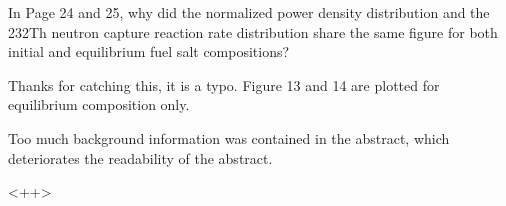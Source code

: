 \documentclass[answers,11pt]{exam}
\begin{document}
\begin{questions}
        \question  In Page 24 and 25, why did the normalized power density 
        distribution and the 232Th neutron capture reaction rate distribution 
        share the same figure for both initial and equilibrium fuel salt 
        compositions?
        \begin{solution}
                Thanks for catching this, it is a typo. Figure 13 and 14 are plotted 
                for equilibrium composition only.            	    
        \end{solution}

        \question  Too much background information was contained in the 
        abstract, which deteriorates the readability of the abstract.
        \begin{solution}
                <++>
        \end{solution}

\end{questions}


\end{document}
